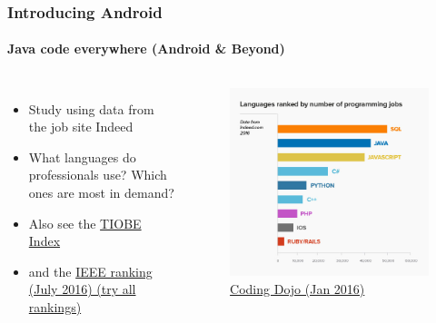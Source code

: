 \documentclass{beamer}
\begin{document}
	\begin{frame}
	\frametitle{Introducing Android}
	\framesubtitle{Java code everywhere (Android \& Beyond)}
	\begin{columns}
		\begin{itemize}
			\item Study using data from the job site Indeed
			\item What languages do professionals use? Which ones are most in demand?
			\item Also see the \href{http://www.tiobe.com/tiobe-index/}{TIOBE Index}
			\item and the \href{http://spectrum.ieee.org/static/interactive-the-top-programming-languages-2016}{IEEE ranking (July 2016) (try all rankings)}
		\end{itemize}
	        \begin{figure}[h]
                \centering
                \includegraphics[width=\textwidth]{./images/Programming-Languages-for-2016_graph}
                \caption[font=tiny]{\href{http://www.codingdojo.com/blog/9-most-in-demand-programming-languages-of-2016/}{Coding Dojo (Jan 2016)}}
        	\end{figure}
	\end{columns}
	\end{frame}
\end{document}
